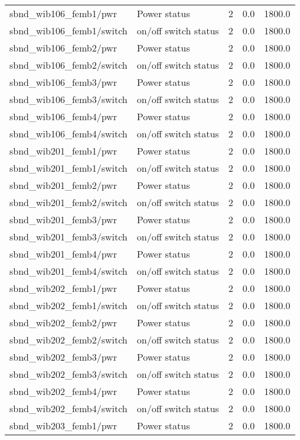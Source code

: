 \begin{center}
\begin{longtable}{l | l l l l }
sbnd\_wib106\_femb1/pwr & Power status & 2 & 0.0 & 1800.0\\ 
sbnd\_wib106\_femb1/switch & on/off switch status & 2 & 0.0 & 1800.0\\ 
sbnd\_wib106\_femb2/pwr & Power status & 2 & 0.0 & 1800.0\\ 
sbnd\_wib106\_femb2/switch & on/off switch status & 2 & 0.0 & 1800.0\\ 
sbnd\_wib106\_femb3/pwr & Power status & 2 & 0.0 & 1800.0\\ 
sbnd\_wib106\_femb3/switch & on/off switch status & 2 & 0.0 & 1800.0\\ 
sbnd\_wib106\_femb4/pwr & Power status & 2 & 0.0 & 1800.0\\ 
sbnd\_wib106\_femb4/switch & on/off switch status & 2 & 0.0 & 1800.0\\ 
sbnd\_wib201\_femb1/pwr & Power status & 2 & 0.0 & 1800.0\\ 
sbnd\_wib201\_femb1/switch & on/off switch status & 2 & 0.0 & 1800.0\\ 
sbnd\_wib201\_femb2/pwr & Power status & 2 & 0.0 & 1800.0\\ 
sbnd\_wib201\_femb2/switch & on/off switch status & 2 & 0.0 & 1800.0\\ 
sbnd\_wib201\_femb3/pwr & Power status & 2 & 0.0 & 1800.0\\ 
sbnd\_wib201\_femb3/switch & on/off switch status & 2 & 0.0 & 1800.0\\ 
sbnd\_wib201\_femb4/pwr & Power status & 2 & 0.0 & 1800.0\\ 
sbnd\_wib201\_femb4/switch & on/off switch status & 2 & 0.0 & 1800.0\\ 
sbnd\_wib202\_femb1/pwr & Power status & 2 & 0.0 & 1800.0\\ 
sbnd\_wib202\_femb1/switch & on/off switch status & 2 & 0.0 & 1800.0\\ 
sbnd\_wib202\_femb2/pwr & Power status & 2 & 0.0 & 1800.0\\ 
sbnd\_wib202\_femb2/switch & on/off switch status & 2 & 0.0 & 1800.0\\ 
sbnd\_wib202\_femb3/pwr & Power status & 2 & 0.0 & 1800.0\\ 
sbnd\_wib202\_femb3/switch & on/off switch status & 2 & 0.0 & 1800.0\\ 
sbnd\_wib202\_femb4/pwr & Power status & 2 & 0.0 & 1800.0\\ 
sbnd\_wib202\_femb4/switch & on/off switch status & 2 & 0.0 & 1800.0\\ 
sbnd\_wib203\_femb1/pwr & Power status & 2 & 0.0 & 1800.0\\ 

\end{longtable}
\end{center}
